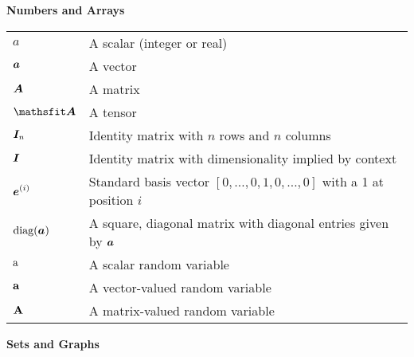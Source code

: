 \documentclass{article} %
\begin{document}
\centerline{\bf Numbers and Arrays}
\bgroup
\def\arraystretch{1.5}
\begin{tabular}{p{1in}p{3.25in}}
   $\displaystyle a$                & A scalar (integer or real)                                               \\
   $\displaystyle {\bm{a}}$              & A vector                                                                 \\
   $\displaystyle {\bm{A}}$              & A matrix                                                                 \\
   $\displaystyle \tA$              & A tensor                                                                 \\
   $\displaystyle {\bm{I}}_n$            & Identity matrix with $n$ rows and $n$ columns                            \\
   $\displaystyle {\bm{I}}$              & Identity matrix with dimensionality implied by context                   \\
   $\displaystyle {\bm{e}}^{(i)}$        & Standard basis vector $[0,\dots,0,1,0,\dots,0]$ with a 1 at position $i$ \\
   $\displaystyle \text{diag}({\bm{a}})$ & A square, diagonal matrix with diagonal entries given by ${\bm{a}}$           \\
   $\displaystyle {\textnormal{a}}$              & A scalar random variable                                                 \\
   $\displaystyle {\mathbf{a}}$             & A vector-valued random variable                                          \\
   $\displaystyle {\mathbf{A}}$             & A matrix-valued random variable                                          \\
\end{tabular}
\egroup
\vspace{0.25cm}

\centerline{\bf Sets and Graphs}
\bgroup
\def\arraystretch{1.5}
\end{document}
